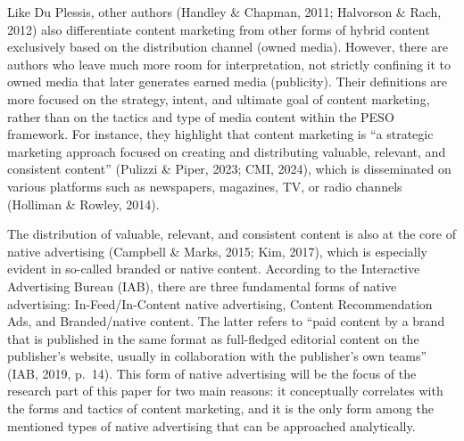 \documentclass[preprint, 3p,
authoryear]{elsarticle} %
\begin{document}
Like Du Plessis, other authors (Handley \& Chapman, 2011; Halvorson \&
Rach, 2012) also differentiate content marketing from other forms of
hybrid content exclusively based on the distribution channel (owned
media). However, there are authors who leave much more room for
interpretation, not strictly confining it to owned media that later
generates earned media (publicity). Their definitions are more focused
on the strategy, intent, and ultimate goal of content marketing, rather
than on the tactics and type of media content within the PESO framework.
For instance, they highlight that content marketing is ``a strategic
marketing approach focused on creating and distributing valuable,
relevant, and consistent content'' (Pulizzi \& Piper, 2023; CMI, 2024),
which is disseminated on various platforms such as newspapers,
magazines, TV, or radio channels (Holliman \& Rowley, 2014).

The distribution of valuable, relevant, and consistent content is also
at the core of native advertising (Campbell \& Marks, 2015; Kim, 2017),
which is especially evident in so-called branded or native content.
According to the Interactive Advertising Bureau (IAB), there are three
fundamental forms of native advertising: In-Feed/In-Content native
advertising, Content Recommendation Ads, and Branded/native content. The
latter refers to ``paid content by a brand that is published in the same
format as full-fledged editorial content on the publisher's website,
usually in collaboration with the publisher's own teams'' (IAB, 2019,
p.~14). This form of native advertising will be the focus of the
research part of this paper for two main reasons: it conceptually
correlates with the forms and tactics of content marketing, and it is
the only form among the mentioned types of native advertising that can
be approached analytically.
\end{document}
